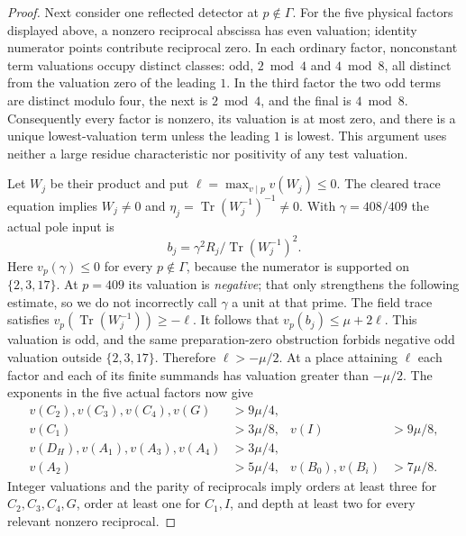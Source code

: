 \documentclass[11pt,a4paper]{article}
\begin{document}
\begin{proof}
Next consider one reflected detector at
$p\notin\Gamma$. For the five physical factors displayed
above, a nonzero reciprocal abscissa has even valuation;
identity numerator points contribute reciprocal zero.
In each ordinary factor, nonconstant term valuations
occupy distinct classes: odd, $2\bmod4$ and $4\bmod8$,
all distinct from the valuation zero of the leading $1$.
In the third factor the two odd terms are distinct
modulo four, the next is $2\bmod4$, and the final
is $4\bmod8$. Consequently every factor is nonzero,
its valuation is at most zero, and there is a unique
lowest-valuation term unless the leading $1$ is lowest.
This argument uses neither a large residue characteristic
nor positivity of any test valuation.

Let $W_j$ be their product and put
$\ell=\max_{v\mid p}v(W_j)\le0$.
The cleared trace equation implies
$W_j\ne0$ and
$\eta_j=\operatorname{Tr}(W_j^{-1})^{-1}\ne0$.
With $\gamma=408/409$ the actual pole input is
\[
 b_j=\gamma^2 R_j/
       \operatorname{Tr}(W_j^{-1})^2.
\]
Here $v_p(\gamma)\le0$ for every $p\notin\Gamma$,
because the numerator is supported on $\{2,3,17\}$.
At $p=409$ its valuation is \emph{negative}; that only
strengthens the following estimate, so we do not
incorrectly call $\gamma$ a unit at that prime.
The field trace satisfies
$v_p(\operatorname{Tr}(W_j^{-1}))\ge-\ell$.
It follows that
$v_p(b_j)\le\mu+2\ell$.
This valuation is odd, and the same
preparation-zero obstruction forbids negative odd
valuation outside $\{2,3,17\}$.
Therefore $\ell>-\mu/2$.
At a place attaining $\ell$ each factor and each of its
finite summands has valuation greater than $-\mu/2$.
The exponents in the five actual factors now give
\[
 \begin{aligned}
  v(C_2),v(C_3),v(C_4),v(G)&>9\mu/4,\\
  v(C_1)&>3\mu/8,&v(I)&>9\mu/8,\\
  v(D_H),v(A_1),v(A_3),v(A_4)&>3\mu/4,\\
  v(A_2)&>5\mu/4,&
  v(B_0),v(B_i)&>7\mu/8 .
 \end{aligned}
\]
Integer valuations and the parity of reciprocals imply
orders at least three for $C_2,C_3,C_4,G$, order at
least one for $C_1,I$, and depth at least two for every
relevant nonzero reciprocal.


\end{proof}
\end{document}
